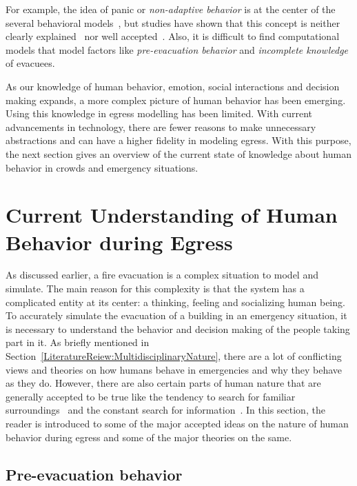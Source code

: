 For example, the idea of panic or \emph{non-adaptive behavior} is at the center of the several behavioral models~\cite{Pan:2006vp,Franca:2009wq}, but studies have shown that this concept is neither clearly explained~\cite{Torres:2010tj} nor well accepted~\cite{Cocking:2005uc,Paulsen:1984ti,Proulx:2001we,Ramachandran:1990wj,Sandberg:1997tw,Sime:1995uu}. Also, it is difficult to find computational models that model factors like \emph{pre-evacuation behavior} and \emph{incomplete knowledge} of evacuees.

As our knowledge of human behavior, emotion, social interactions and decision making expands, a more complex picture of human behavior has been emerging. Using this knowledge in egress modelling has been limited. With current advancements in technology, there are fewer reasons to make unnecessary abstractions and can have a higher fidelity in modeling egress. With this purpose, the next section gives an overview of the current state of knowledge about human behavior in crowds and emergency situations.

\section{Current Understanding of Human Behavior during Egress}
\label{LiteratureReview:CurrentUnderstanding}

As discussed earlier, a fire evacuation is a complex situation to model and simulate. The main reason for this complexity is that the system has a complicated entity at its center: a thinking, feeling and socializing human being. To accurately simulate the evacuation of a building in an emergency situation, it is necessary to understand the behavior and decision making of the people taking part in it. As briefly mentioned in Section~\ref{LiteratureReiew:MultidisciplinaryNature}, there are a lot of conflicting views and theories on how humans behave in emergencies and why they behave as they do. However, there are also certain parts of human nature that are generally accepted to be true like the tendency to search for familiar surroundings~\cite{Mawson:2005tq,Paulsen:1984ti,Ramachandran:1990wj,Sandberg:1997tw} and the constant search for information~\cite{Proulx:2003tc,Tong:1985wn,Ozel:2001tn,Sime:1983uy}. In this section, the reader is introduced to some of the major accepted ideas on the nature of human behavior during egress and some of the major theories on the same.

\subsection{Pre-evacuation behavior}
\label{LiteratureReview:HowItAllBegins}

